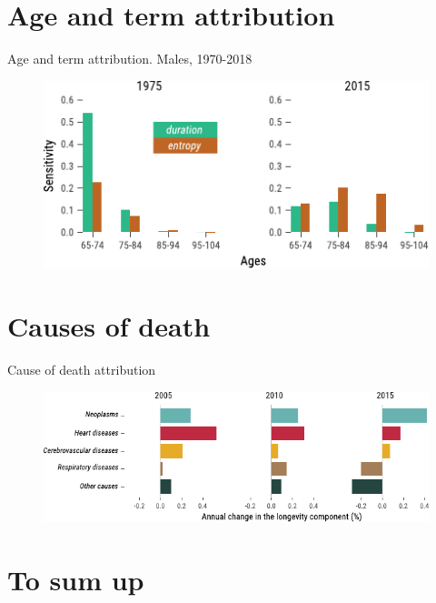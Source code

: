 \documentclass[10pt]{beamer}
\begin{document}
\section{Age and term attribution}




\begin{frame}{Age and term attribution. Males, 1970-2018}
\begin{figure}
	\centering
	\hspace*{-0.9cm}
	\includegraphics[scale=1.5] {Fig/AttributionDH.pdf}
\end{figure}
\end{frame}


\section{Causes of death}


\begin{frame}{Cause of death attribution}
\begin{figure}
	\centering
	\hspace*{-0.9cm}
	\includegraphics[scale=1] {Fig/DescCod.pdf}
\end{figure}
\end{frame}


\section{To sum up}
\end{document}
